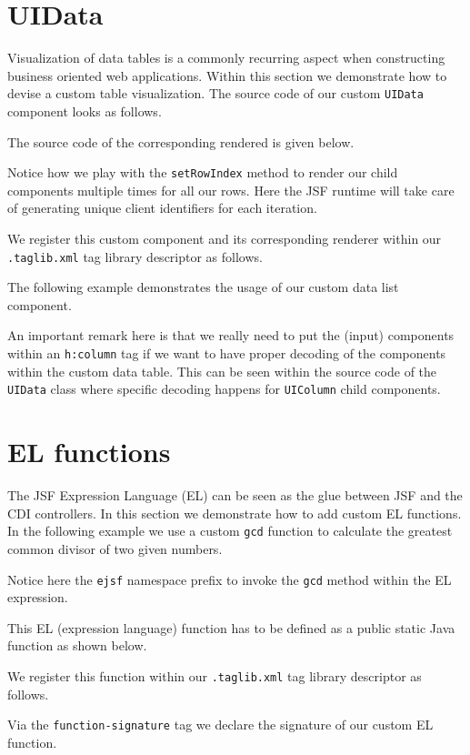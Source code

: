 \section{UIData}
Visualization of data tables is a commonly recurring aspect when constructing business oriented web applications.
Within this section we demonstrate how to devise a custom table visualization.
The source code of our custom \texttt{UIData} component looks as follows.


The source code of the corresponding rendered is given below.

Notice how we play with the \texttt{setRowIndex} method to render our child components multiple times for all our rows.
Here the JSF runtime will take care of generating unique client identifiers for each iteration.

We register this custom component and its corresponding renderer within our \texttt{.taglib.xml} tag library descriptor as follows.


The following example demonstrates the usage of our custom data list component.

An important remark here is that we really need to put the (input) components within an \texttt{h:column} tag if we want to have proper decoding of the components within the custom data table.
This can be seen within the source code of the \texttt{UIData} class where specific decoding happens for \texttt{UIColumn} child components.


\section{EL functions}
The JSF Expression Language (EL) can be seen as the glue between JSF and the CDI controllers.
In this section we demonstrate how to add custom EL functions.
In the following example we use a custom \texttt{gcd} function to calculate the greatest common divisor of two given numbers.

Notice here the \texttt{ejsf} namespace prefix to invoke the \texttt{gcd} method within the EL expression.

This EL (expression language) function has to be defined as a public static Java function as shown below.


We register this function within our \texttt{.taglib.xml} tag library descriptor as follows.

Via the \texttt{function-signature} tag we declare the signature of our custom EL function.
